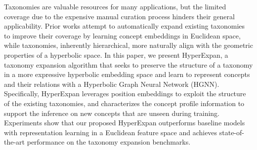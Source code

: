 Taxonomies are valuable resources for many applications, but the limited coverage due to the expensive manual curation process hinders their general applicability. Prior works attempt to automatically expand existing taxonomies to improve their coverage by learning concept embeddings in Euclidean space, while taxonomies, inherently hierarchical, more naturally align with the geometric properties of a hyperbolic space. In this paper, we present HyperExpan, a taxonomy expansion algorithm that seeks to preserve the structure of a taxonomy in a more expressive hyperbolic embedding space and learn to represent concepts and their relations with a Hyperbolic Graph Neural Network (HGNN). Specifically, HyperExpan leverages position embeddings to exploit the structure of the existing taxonomies, and characterizes the concept profile information to support the inference on new concepts that are unseen during training. Experiments show that our proposed HyperExpan outperforms baseline models with representation learning in a Euclidean feature space and achieves state-of-the-art performance on the taxonomy expansion benchmarks.
